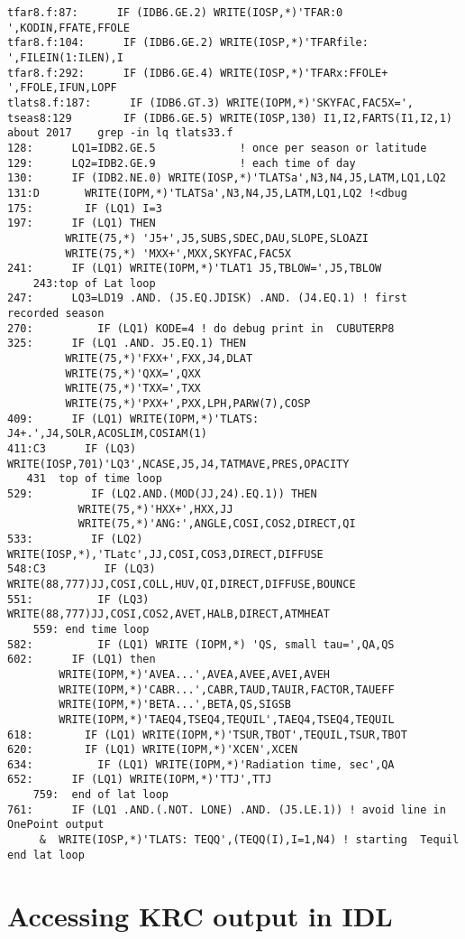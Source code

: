 \documentclass{article}
\begin{document}
\begin{verbatim}
tfar8.f:87:      IF (IDB6.GE.2) WRITE(IOSP,*)'TFAR:0 ',KODIN,FFATE,FFOLE
tfar8.f:104:      IF (IDB6.GE.2) WRITE(IOSP,*)'TFARfile: ',FILEIN(1:ILEN),I
tfar8.f:292:      IF (IDB6.GE.4) WRITE(IOSP,*)'TFARx:FFOLE+ ',FFOLE,IFUN,LOPF
tlats8.f:187:      IF (IDB6.GT.3) WRITE(IOPM,*)'SKYFAC,FAC5X=',
tseas8:129        IF (IDB6.GE.5) WRITE(IOSP,130) I1,I2,FARTS(I1,I2,1)
about 2017    grep -in lq tlats33.f
128:      LQ1=IDB2.GE.5             ! once per season or latitude
129:      LQ2=IDB2.GE.9             ! each time of day
130:      IF (IDB2.NE.0) WRITE(IOSP,*)'TLATSa',N3,N4,J5,LATM,LQ1,LQ2
131:D       WRITE(IOPM,*)'TLATSa',N3,N4,J5,LATM,LQ1,LQ2 !<dbug
175:        IF (LQ1) I=3
197:      IF (LQ1) THEN
         WRITE(75,*) 'J5+',J5,SUBS,SDEC,DAU,SLOPE,SLOAZI
         WRITE(75,*) 'MXX+',MXX,SKYFAC,FAC5X
241:      IF (LQ1) WRITE(IOPM,*)'TLAT1 J5,TBLOW=',J5,TBLOW
    243:top of Lat loop
247:      LQ3=LD19 .AND. (J5.EQ.JDISK) .AND. (J4.EQ.1) ! first recorded season
270:          IF (LQ1) KODE=4 ! do debug print in  CUBUTERP8
325:      IF (LQ1 .AND. J5.EQ.1) THEN
         WRITE(75,*)'FXX+',FXX,J4,DLAT
         WRITE(75,*)'QXX=',QXX 
         WRITE(75,*)'TXX=',TXX
         WRITE(75,*)'PXX+',PXX,LPH,PARW(7),COSP
409:      IF (LQ1) WRITE(IOPM,*)'TLATS: J4+.',J4,SOLR,ACOSLIM,COSIAM(1)
411:C3      IF (LQ3) WRITE(IOSP,701)'LQ3',NCASE,J5,J4,TATMAVE,PRES,OPACITY
   431  top of time loop
529:         IF (LQ2.AND.(MOD(JJ,24).EQ.1)) THEN
           WRITE(75,*)'HXX+',HXX,JJ
           WRITE(75,*)'ANG:',ANGLE,COSI,COS2,DIRECT,QI
533:         IF (LQ2) WRITE(IOSP,*),'TLatc',JJ,COSI,COS3,DIRECT,DIFFUSE 
548:C3         IF (LQ3) WRITE(88,777)JJ,COSI,COLL,HUV,QI,DIRECT,DIFFUSE,BOUNCE
551:          IF (LQ3) WRITE(88,777)JJ,COSI,COS2,AVET,HALB,DIRECT,ATMHEAT
    559: end time loop
582:          IF (LQ1) WRITE (IOPM,*) 'QS, small tau=',QA,QS
602:      IF (LQ1) then
        WRITE(IOPM,*)'AVEA...',AVEA,AVEE,AVEI,AVEH
        WRITE(IOPM,*)'CABR...',CABR,TAUD,TAUIR,FACTOR,TAUEFF
        WRITE(IOPM,*)'BETA...',BETA,QS,SIGSB 
        WRITE(IOPM,*)'TAEQ4,TSEQ4,TEQUIL',TAEQ4,TSEQ4,TEQUIL
618:        IF (LQ1) WRITE(IOPM,*)'TSUR,TBOT',TEQUIL,TSUR,TBOT 
620:        IF (LQ1) WRITE(IOPM,*)'XCEN',XCEN 
634:          IF (LQ1) WRITE(IOPM,*)'Radiation time, sec',QA 
652:      IF (LQ1) WRITE(IOPM,*)'TTJ',TTJ
    759:  end of lat loop
761:      IF (LQ1 .AND.(.NOT. LONE) .AND. (J5.LE.1)) ! avoid line in  OnePoint output
     &  WRITE(IOSP,*)'TLATS: TEQQ',(TEQQ(I),I=1,N4) ! starting  Tequil 
end lat loop
\end{verbatim}

\section{Accessing KRC output in IDL} %
\end{document}
